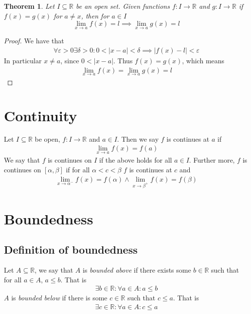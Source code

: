 \documentclass{article}
\newtheorem{theorem}{Theorem}[section]
\begin{document}
\begin{theorem}
	Let $I \subseteq \mathbb{R}$ be an open set. Given functions $f: I
	\rightarrow \mathbb{R}$ and $g: I \rightarrow \mathbb{R}$ if $f(x)=g(x)$ for
	$a \neq x$, then for $a \in I$
	\[\lim_{x \rightarrow a} f(x) = l \implies \lim_{x \rightarrow a} g(x) = l\]
\end{theorem}
\begin{proof}
We have that
\begin{align*}
	\forall \varepsilon > 0 \exists \delta > 0: 0<|x-a|<\delta 
	\implies |f(x)-l| < \varepsilon
\end{align*}
In particular $x \neq a$, since $0<|x-a|$. Thus $f(x)=g(x)$, which means
\begin{align*}
	\lim_{x \rightarrow a} f(x) = \lim_{x \rightarrow a} g(x) = l
\end{align*}

\end{proof}

\section{Continuity}
Let $I \subseteq \mathbb{R}$ be open, $f: I \rightarrow \mathbb{R}$ and 
$a \in I$. Then we say $f$ is continues at $a$ if
\begin{align}
	\lim_{x \rightarrow a} f(x)=f(a)
\end{align}
We say that $f$ is continues on $I$ if the above holds for all $a \in I$.
Further more, $f$ is continues on $[\alpha,\beta]$ if for all 
$\alpha < c < \beta$ $f$ is continues at $c$ and
\begin{align}
	\lim_{x \rightarrow \alpha^-} f(x)=f(\alpha) \land 
	\lim_{x \rightarrow \beta^+} f(x)=f(\beta)
\end{align}

\section{Boundedness}
\subsection{Definition of boundedness}
Let $A \subseteq \mathbb{R}$, we say that $A$ is \textit{bounded above} if there
exists some $b \in \mathbb{R}$ such that for all $a \in A$, $a \leq b$. That is
\begin{align*}
	\exists b \in \mathbb{R}: \forall a \in A: a \leq b
\end{align*}
$A$ is \textit{bounded below} if there is some $c \in \mathbb{R}$ such that $c
\leq a$. That is
\begin{align*}
	\exists c \in \mathbb{R}: \forall a \in A: c \leq a
\end{align*}
\end{document}
